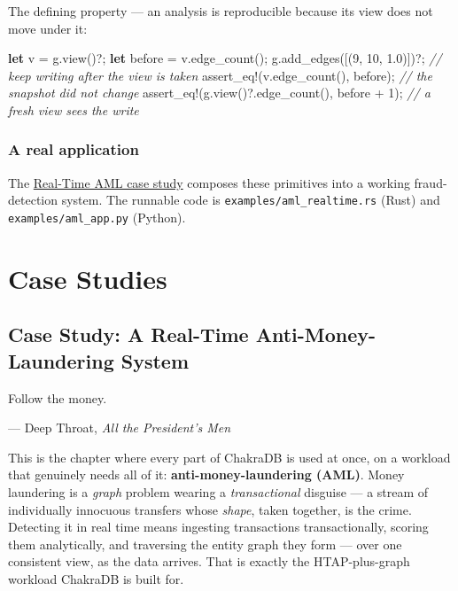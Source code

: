 \documentclass[
  11pt,
  openany]{book}
\newenvironment{Shaded}{}{}
\newcommand{\CommentTok}[1]{\textcolor[rgb]{0.38,0.63,0.69}{\textit{#1}}}
\newcommand{\DecValTok}[1]{\textcolor[rgb]{0.25,0.63,0.44}{#1}}
\newcommand{\KeywordTok}[1]{\textcolor[rgb]{0.00,0.44,0.13}{\textbf{#1}}}
\newcommand{\NormalTok}[1]{#1}
\newcommand{\OperatorTok}[1]{\textcolor[rgb]{0.40,0.40,0.40}{#1}}
\newcommand{\PreprocessorTok}[1]{\textcolor[rgb]{0.74,0.48,0.00}{#1}}
\begin{document}
The defining property --- an analysis is reproducible because its view
does not move under it:

\begin{Shaded}
\begin{Highlighting}[]
\KeywordTok{let}\NormalTok{ v }\OperatorTok{=}\NormalTok{ g}\OperatorTok{.}\NormalTok{view()}\OperatorTok{?;}
\KeywordTok{let}\NormalTok{ before }\OperatorTok{=}\NormalTok{ v}\OperatorTok{.}\NormalTok{edge\_count()}\OperatorTok{;}
\NormalTok{g}\OperatorTok{.}\NormalTok{add\_edges([(}\DecValTok{9}\OperatorTok{,} \DecValTok{10}\OperatorTok{,} \DecValTok{1.0}\NormalTok{)])}\OperatorTok{?;}           \CommentTok{// keep writing after the view is taken}
\PreprocessorTok{assert\_eq!}\NormalTok{(v}\OperatorTok{.}\NormalTok{edge\_count()}\OperatorTok{,}\NormalTok{ before)}\OperatorTok{;}     \CommentTok{// the snapshot did not change}
\PreprocessorTok{assert\_eq!}\NormalTok{(g}\OperatorTok{.}\NormalTok{view()}\OperatorTok{?.}\NormalTok{edge\_count()}\OperatorTok{,}\NormalTok{ before }\OperatorTok{+} \DecValTok{1}\NormalTok{)}\OperatorTok{;}  \CommentTok{// a fresh view sees the write}
\end{Highlighting}
\end{Shaded}

\section{A real application}\label{a-real-application}

The \href{../case-studies/aml.md}{Real-Time AML case study} composes
these primitives into a working fraud-detection system. The runnable
code is \texttt{examples/aml\_realtime.rs} (Rust) and
\texttt{examples/aml\_app.py} (Python).

\part{Case Studies}

\chapter{Case Study: A Real-Time Anti-Money-Laundering
System}\label{case-study-a-real-time-anti-money-laundering-system}

\epigraph{Follow the money.}{--- Deep Throat, \textit{All the President's Men}}

This is the chapter where every part of ChakraDB is used at once, on a
workload that genuinely needs all of it: \textbf{anti-money-laundering
(AML)}. Money laundering is a \emph{graph} problem wearing a
\emph{transactional} disguise --- a stream of individually innocuous
transfers whose \emph{shape}, taken together, is the crime. Detecting it
in real time means ingesting transactions transactionally, scoring them
analytically, and traversing the entity graph they form --- over one
consistent view, as the data arrives. That is exactly the
HTAP-plus-graph workload ChakraDB is built for.
\end{document}
